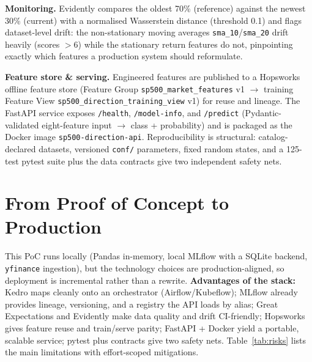 \documentclass[12pt]{article}
\newcommand{\boldparagraph}[1]{\textbf{#1}\hspace{5pt}}
\begin{document}
\boldparagraph{Monitoring.} Evidently compares the oldest 70\% (reference) against the newest 30\% (current) with a normalised Wasserstein distance (threshold 0.1) and flags dataset-level drift: the non-stationary moving averages \texttt{sma\_10}/\texttt{sma\_20} drift heavily (scores $>6$) while the stationary return features do not, pinpointing exactly which features a production system should reformulate.

\boldparagraph{Feature store \& serving.} Engineered features are published to a Hopsworks offline feature store (Feature Group \texttt{sp500\_market\_features} v1 $\rightarrow$ training Feature View \texttt{sp500\_direction\_training\_view} v1) for reuse and lineage. The FastAPI service exposes \texttt{/health}, \texttt{/model-info}, and \texttt{/predict} (Pydantic-validated eight-feature input $\rightarrow$ class + probability) and is packaged as the Docker image \texttt{sp500-direction-api}. Reproducibility is structural: catalog-declared datasets, versioned \texttt{conf/} parameters, fixed random states, and a 125-test pytest suite plus the data contracts give two independent safety nets.

\section{From Proof of Concept to Production}

This PoC runs locally (Pandas in-memory, local MLflow with a SQLite backend, \texttt{yfinance} ingestion), but the technology choices are production-aligned, so deployment is incremental rather than a rewrite. \textbf{Advantages of the stack:} Kedro maps cleanly onto an orchestrator (Airflow/Kubeflow); MLflow already provides lineage, versioning, and a registry the API loads by alias; Great Expectations and Evidently make data quality and drift CI-friendly; Hopsworks gives feature reuse and train/serve parity; FastAPI + Docker yield a portable, scalable service; pytest plus contracts give two safety nets. Table~\ref{tab:risks} lists the main limitations with effort-scoped mitigations.
\end{document}
